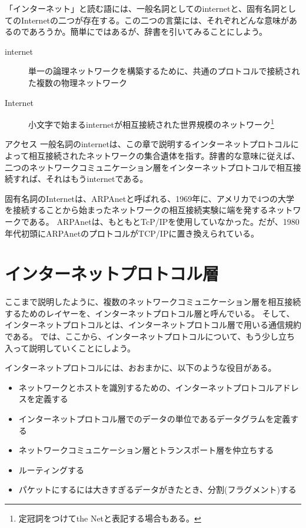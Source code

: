 「インターネット」と読む語には、一般名詞としてのinternetと、固有名詞としてのInternetの二つが存在する。この二つの言葉には、それぞれどんな意味があるのであろうか。簡単にではあるが、辞書を引いてみることにしよう。

\begin{description}
\item[internet]単一の論理ネットワークを構築するために、共通のプロトコルで接続された複数の物理ネットワーク
\item[Internet]小文字で始まるinternetが相互接続された世界規模のネットワーク\footnote{定冠詞をつけてthe Netと表記する場合もある。}
\end{description}
アクセス
一般名詞のinternetは、この章で説明するインターネットプロトコルによって相互接続されたネットワークの集合遺体を指す。辞書的な意味に従えば、二つのネットワークコミュニケーション層をインターネットプロトコルで相互接続すれば、それはもうinternetである。

固有名詞のInternetは、ARPAnetと呼ばれる、1969年に、アメリカで4つの大学を接続することから始まったネットワークの相互接続実験に端を発するネットワークである。
ARPAnetは、もともとTcP/IPを使用していなかった。だが、1980年代初頭にARPAnetのプロトコルがTCP/IPに置き換えられている。

\section{インターネットプロトコル層}

ここまで説明したように、複数のネットワークコミュニケーション層を相互接続するためのレイヤーを、インターネットプロトコル層と呼んでいる。
そして、インターネットプロトコルとは、インターネットプロトコル層で用いる通信規約である。
では、ここから、インターネットプロトコルについて、もう少し立ち入って説明していくことにしよう。

インターネットプロトコルには、おおまかに、以下のような役目がある。

\begin{itemize}
\item ネットワークとホストを識別するための、インターネットプロトコルアドレスを定義する 
\item インターネットプロトコル層でのデータの単位であるデータグラムを定義する 
\item ネットワークコミュニケーション層とトランスポート層を仲立ちする 
\item ルーティングする
\item パケットにするには大きすぎるデータがきたとき、分割(フラグメント)する
\end{itemize}

